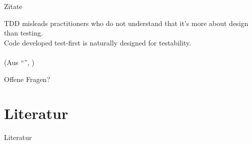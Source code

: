 \documentclass{f4_beamer_metropolis}
\begin{document}
\begin{frame}{Zitate}
  \begin{displayquote}
  TDD misleads practitioners who do not understand that it's more about design than testing. \\
  Code developed test-first is naturally designed for testability.
  \\
  \\
  (Aus \enquote{\textbf{}}, \citeauthor{crispinlisa_gregoryjanet_2014})
  \end{displayquote}
\end{frame}

\begin{frame}[standout]
  Offene Fragen?
\end{frame}

\appendix

\section{Literatur}

\begin{frame}[allowframebreaks]{Literatur}
  \printbibliography
\end{frame}
\end{document}
